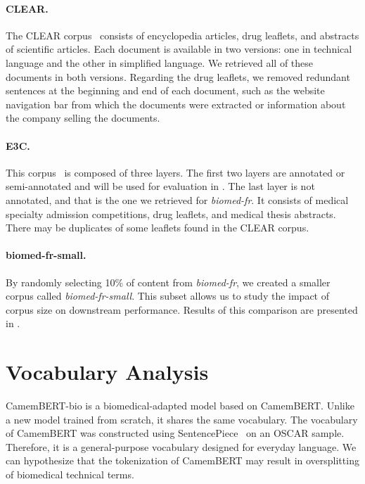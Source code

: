 \paragraph{CLEAR.} The CLEAR corpus~\citep{grabar_clear_2018} consists of encyclopedia articles, drug leaflets, and abstracts of scientific articles. Each document is available in two versions: one in technical language and the other in simplified language. We retrieved all of these documents in both versions. Regarding the drug leaflets, we removed redundant sentences at the beginning and end of each document, such as the website navigation bar from which the documents were extracted or information about the company selling the documents.

\paragraph{E3C.} This corpus~\citep{magnini_e3c_2021} is composed of three layers. The first two layers are annotated or semi-annotated and will be used for evaluation in . The last layer is not annotated, and that is the one we retrieved for \textit{biomed-fr}. It consists of medical specialty admission competitions, drug leaflets, and medical thesis abstracts. There may be duplicates of some leaflets found in the CLEAR corpus.

\paragraph{biomed-fr-small.} By randomly selecting 10\% of content from \textit{biomed-fr}, we created a smaller corpus called \textit{biomed-fr-small}. This subset allows us to study the impact of corpus size on downstream performance. Results of this comparison are presented in .


\section{Vocabulary Analysis}
\label{sec:vocab-analysis}

\begin{reviewread}
CamemBERT-bio is a biomedical-adapted model based on CamemBERT. Unlike a new model trained from scratch, it shares the same vocabulary. The vocabulary of CamemBERT was constructed using SentencePiece~\citep{kudo_sentencepiece_2018} on an OSCAR sample. Therefore, it is a general-purpose vocabulary designed for everyday language. We can hypothesize that the tokenization of CamemBERT may result in oversplitting of biomedical technical terms.
\end{reviewread}

